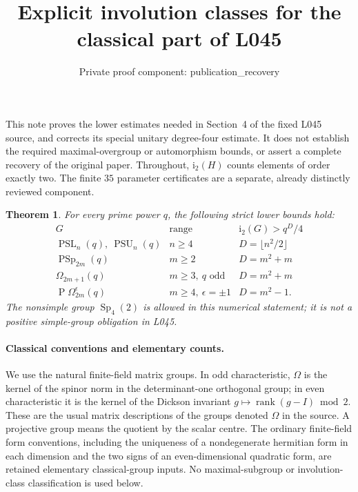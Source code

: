 \documentclass[10pt]{article}
\title{Explicit involution classes for the classical part of L045}
\author{Private proof component: publication\_recovery}
\date{}
\newtheorem{theorem}{Theorem}
\newcommand{\Sp}{\operatorname{Sp}}
\newcommand{\PSL}{\operatorname{PSL}}
\newcommand{\PSU}{\operatorname{PSU}}
\newcommand{\PSp}{\operatorname{PSp}}
\newcommand{\Om}{\Omega}
\newcommand{\ii}{\mathrm i_2}
\begin{document}
\maketitle
\noindent This note proves the lower estimates needed in Section~4 of the
fixed L045 source, and corrects its special unitary degree-four estimate.
It does not establish the required maximal-overgroup or automorphism bounds,
or assert a complete recovery of the original paper. Throughout, $\ii(H)$
counts elements of order exactly two. The finite $35$ parameter certificates
are a separate, already distinctly reviewed component.

\begin{theorem}\label{main}
For every prime power $q$, the following strict lower bounds hold:
\[
\begin{array}{c|c|c}
G&\text{range}&\ii(G)>q^D/4\\\hline
\PSL_n(q),\ \PSU_n(q)&n\ge4&D=\lfloor n^2/2\rfloor\\
\PSp_{2m}(q)&m\ge2&D=m^2+m\\
\Om_{2m+1}(q)&m\ge3,\ q\text{ odd}&D=m^2+m\\
\operatorname{P}\Om_{2m}^{\epsilon}(q)&m\ge4,\ \epsilon=\pm1&D=m^2-1.
\end{array}
\]
The nonsimple group $\Sp_4(2)$ is allowed in this numerical statement;
it is not a positive simple-group obligation in L045.
\end{theorem}

\paragraph{Classical conventions and elementary counts.}
We use the natural finite-field matrix groups. In odd characteristic,
$\Om$ is the kernel of the spinor norm in the determinant-one orthogonal
group; in even characteristic it is the kernel of the Dickson invariant
$g\mapsto\operatorname{rank}(g-I)\bmod2$. These are the usual matrix
descriptions of the groups denoted $\Om$ in the source. A projective group
means the quotient by the scalar centre. The ordinary finite-field form
conventions, including the uniqueness of a nondegenerate hermitian form
in each dimension and the two signs of an even-dimensional quadratic form,
are retained elementary classical-group inputs. No maximal-subgroup or
involution-class classification is used below.
\end{document}
